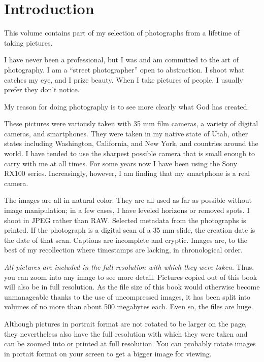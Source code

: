 \chapter{Introduction}

This volume contains part of my selection of photographs from a lifetime of taking pictures. 

I have never been a professional, but I was and am committed to the art of photography. I am a ``street photographer'' open to abstraction. I shoot what catches my eye, and I prize beauty. When I take pictures of people, I usually prefer they don't notice. 

My reason for doing photography is to see more clearly what God has created.

These pictures were variously taken with 35 mm film cameras, a variety of digital cameras, and smartphones. They were taken in my native state of Utah, other states including Washington, California, and New York, and countries around the world. I have tended to use the sharpest possible camera that is small enough to carry with me at all times. For some years now I have been using the Sony RX100 series. Increasingly, however, I am finding that my smartphone is a real camera.

The images are all in natural color. They are all used as far as possible without image manipulation; in a few cases, I have leveled horizons or removed spots. I shoot in JPEG rather than RAW. Selected metadata from the photographs is printed. If the photograph is a digital scan of a 35 mm slide, the creation date is the date of that scan. Captions are incomplete and cryptic. Images are, to the best of my recollection where timestamps are lacking, in chronological order.

\emph{All pictures are included in the full resolution with which they were taken}. Thus, you can zoom into any image to see more detail. Pictures copied out of this book will also be in full resolution. As the file size of this book would otherwise become unmanageable thanks to the use of uncompressed images, it has been split into volumes of no more than about 500 megabytes each. Even so, the files are huge. 

Although pictures in portrait format are not rotated to be larger on the page, they nevertheless also have the full resolution with which they were taken and can be zoomed into or printed at full resolution. You can probably rotate images in portait format on your screen to get a bigger image for viewing.

